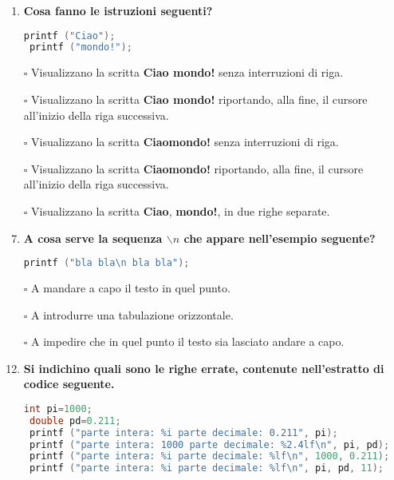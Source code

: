 \documentclass[9pt]{article}
\begin{document}
\begin{enumerate}
 \item {\bf Cosa fanno le istruzioni seguenti?}
 
 \begin{lstlisting}[language=c]
 printf ("Ciao");
 printf ("mondo!");
  \end{lstlisting}
 
\item[$\square$] Visualizzano la scritta {\bf Ciao mondo!} senza interruzioni di riga.
\item[$\square$] Visualizzano la scritta {\bf Ciao mondo!} riportando, alla fine, il cursore all'inizio della riga successiva.
\item[$\square$] Visualizzano la scritta {\bf Ciaomondo!} senza interruzioni di riga.
\item[$\square$] Visualizzano la scritta {\bf Ciaomondo!} riportando, alla fine, il cursore all'inizio della riga successiva.
\item[$\square$] Visualizzano la scritta {\bf Ciao}, {\bf mondo!}, in due righe separate.
 
 
 \item  {\bf A cosa serve la sequenza $\backslash n$ che appare nell'esempio seguente?}
 \begin{lstlisting}[language=c]
 printf ("bla bla\n bla bla");
 \end{lstlisting}
 
\item[$\square$]  A mandare a capo il testo in quel punto.
\item[$\square$]  A introdurre una tabulazione orizzontale.
\item[$\square$]  A impedire che in quel punto il testo sia lasciato andare a capo.


\item [\nonumber]
\item {\bf Si indichino quali sono le righe errate, contenute nell'estratto di codice seguente.}
\item [\nonumber]
\item [\nonumber]

 \begin{lstlisting}[language=c]
 int pi=1000;
 double pd=0.211;
 printf ("parte intera: %i parte decimale: 0.211", pi);
 printf ("parte intera: 1000 parte decimale: %2.4lf\n", pi, pd);
 printf ("parte intera: %i parte decimale: %lf\n", 1000, 0.211);
 printf ("parte intera: %i parte decimale: %lf\n", pi, pd, 11);
 \end{lstlisting}
 

\end{enumerate}
\end{document}
